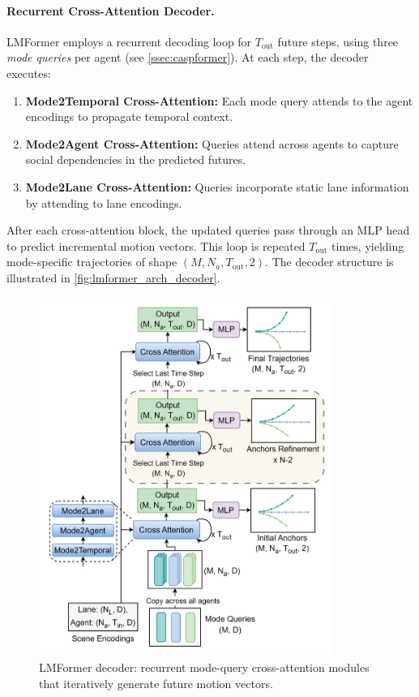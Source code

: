 \paragraph{Recurrent Cross-Attention Decoder.}
LMFormer employs a recurrent decoding loop for \(T_{\text{out}}\) future steps, using three \emph{mode queries} per agent (see \autoref{ssec:caspformer}). At each step, the decoder executes:

\begin{enumerate}[leftmargin=*]
  \item \textbf{Mode2Temporal Cross-Attention:} Each mode query attends to the agent encodings to propagate temporal context.
  \item \textbf{Mode2Agent Cross-Attention:} Queries attend across agents to capture social dependencies in the predicted futures.
  \item \textbf{Mode2Lane Cross-Attention:} Queries incorporate static lane information by attending to lane encodings.
\end{enumerate}

After each cross-attention block, the updated queries pass through an MLP head to predict incremental motion vectors. This loop is repeated \(T_{\text{out}}\) times, yielding mode-specific trajectories of shape \((M, N_a, T_{\text{out}}, 2)\). The decoder structure is illustrated in \autoref{fig:lmformer_arch_decoder}.

\begin{figure}[ht]
  \centering
  \includegraphics[width=0.85\textwidth]{figures/lmformer_arch_decoder.png}
  \caption{LMFormer decoder: recurrent mode-query cross-attention modules that iteratively generate future motion vectors.}
  \label{fig:lmformer_arch_decoder}
\end{figure}


